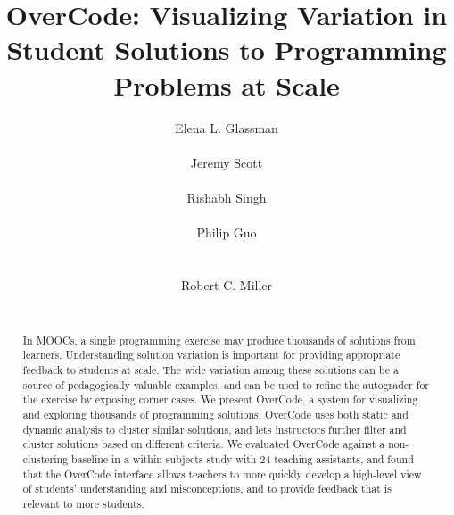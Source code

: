 \documentclass{sigchi}
\begin{document}
\title{OverCode: Visualizing Variation in Student Solutions to Programming Problems at Scale}

\author{
  \alignauthor Elena L. Glassman\\
    \\
  \alignauthor Jeremy Scott\\
    \\
  \alignauthor Rishabh Singh\\
    \\
      \alignauthor Philip Guo\\
      \\
      \\
            \alignauthor Robert C. Miller\\
      \\
}


\maketitle

\begin{abstract}
In MOOCs, a single programming exercise may produce thousands of solutions from learners. Understanding solution variation is important for providing appropriate feedback to students at scale.  The wide variation among these solutions can be a source of pedagogically valuable examples, and can be used to refine the autograder for the exercise by exposing corner cases. 
We present OverCode, a system for visualizing and exploring thousands of programming solutions. OverCode uses both static and dynamic analysis to cluster similar solutions, and lets instructors further filter and cluster solutions based on different criteria.
We evaluated OverCode against a non-clustering baseline in a within-subjects study with 24 teaching assistants, and found that the OverCode interface allows teachers to more quickly develop a high-level view of students' understanding and misconceptions, and to provide feedback that is relevant to more students.
\end{abstract}


\end{document}
